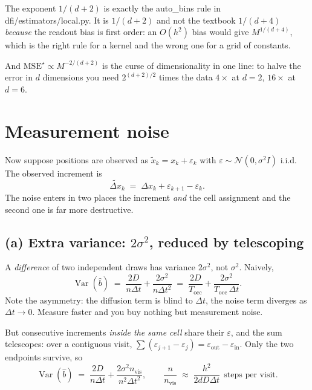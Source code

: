 \documentclass[11pt,a4paper]{article}
\newcommand{\code}[1]{{\ttfamily\small #1}}
\newcommand{\dx}{\Delta x}
\newcommand{\dt}{\Delta t}
\begin{document}
\begin{okbox}
The exponent $1/(d+2)$ is exactly the \code{auto\_bins} rule in
\code{dfi/estimators/local.py}. It is $1/(d+2)$ and not the textbook $1/(d+4)$
\emph{because} the readout bias is first order: an $O(h^{2})$ bias would give
$M^{1/(d+4)}$, which is the right rule for a kernel and the wrong one for a grid
of constants.

And $\mathrm{MSE}^{\star}\propto M^{-2/(d+2)}$ is the curse of dimensionality in
one line: to halve the error in $d$ dimensions you need $2^{(d+2)/2}$ times the
data \textemdash{} $4\times$ at $d=2$, $16\times$ at $d=6$.
\end{okbox}

\section{Measurement noise}
\label{sec:noise}

Now suppose positions are observed as $\tilde x_k = x_k+\varepsilon_k$ with
$\varepsilon\sim\mathcal N(0,\sigma^{2}I)$ i.i.d. The observed increment is
\begin{equation}
  \widetilde{\dx}_k \;=\; \dx_k + \varepsilon_{k+1}-\varepsilon_k .
  \label{eq:noisyinc}
\end{equation}
The noise enters in two places \textemdash{} the increment \emph{and} the cell assignment
\textemdash{} and the second one is far more destructive.

\subsection{(a) Extra variance: $2\sigma^{2}$, reduced by telescoping}

A \emph{difference} of two independent draws has variance $2\sigma^{2}$, not $\sigma^{2}$.
Naively,
\begin{equation}
  \operatorname{Var}(\hat b)\;=\;\frac{2D}{n\dt}+\frac{2\sigma^{2}}{n\dt^{2}}
  \;=\;\frac{2D}{T_{\mathrm{occ}}}+\frac{2\sigma^{2}}{T_{\mathrm{occ}}\,\dt} .
\end{equation}
Note the asymmetry: the diffusion term is blind to $\dt$, the noise term diverges as
$\dt\to0$. Measure faster and you buy nothing but measurement noise.

But consecutive increments \emph{inside the same cell} share their $\varepsilon$, and the
sum telescopes: over a contiguous visit, $\sum(\varepsilon_{j+1}-\varepsilon_j)
= \varepsilon_{\text{out}}-\varepsilon_{\text{in}}$. Only the two endpoints survive, so
\begin{equation}
  \operatorname{Var}(\hat b)\;=\;\frac{2D}{n\dt}+\frac{2\sigma^{2}n_{\mathrm{vis}}}{n^{2}\dt^{2}},
  \qquad
  \frac{n}{n_{\mathrm{vis}}}\;\approx\;\frac{h^{2}}{2dD\dt}\ \ \text{steps per visit.}
  \label{eq:tele}
\end{equation}
\end{document}
